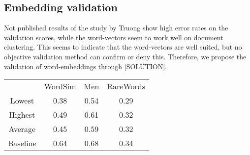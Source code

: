 \documentclass[../../Thesis.tex]{subfiles}
\begin{document}
\subsection{Embedding validation}Not published results of the study by Truong show high error rates on the validation scores, while the word-vectors seem to work well on document clustering. This seems to indicate that the word-vectors are well suited, but no objective validation method can confirm or deny this. Therefore, we propose the validation of word-embeddings through [SOLUTION].


\begin{tabular}{c c c c}
&WordSim & Men & RareWords\\
Lowest & 0.38 & 0.54 & 0.29 \\
Highest & 0.49 & 0.61 & 0.32\\
Average & 0.45 & 0.59 & 0.32\\
Baseline & 0.64 & 0.68 & 0.34\\
\end{tabular}
\end{document}

